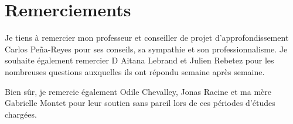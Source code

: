\chapter*{Remerciements}

Je tiens à remercier mon professeur et conseiller de projet d'approfondissement Carlos Peña-Reyes pour ses conseils, sa sympathie et son professionnalisme. Je souhaite également remercier D Aitana Lebrand et Julien Rebetez pour les nombreuses questions auxquelles ils ont répondu semaine après semaine.

Bien sûr, je remercie également Odile Chevalley, Jonas Racine et ma mère Gabrielle Montet pour leur soutien sans pareil lors de ces périodes d'études chargées.